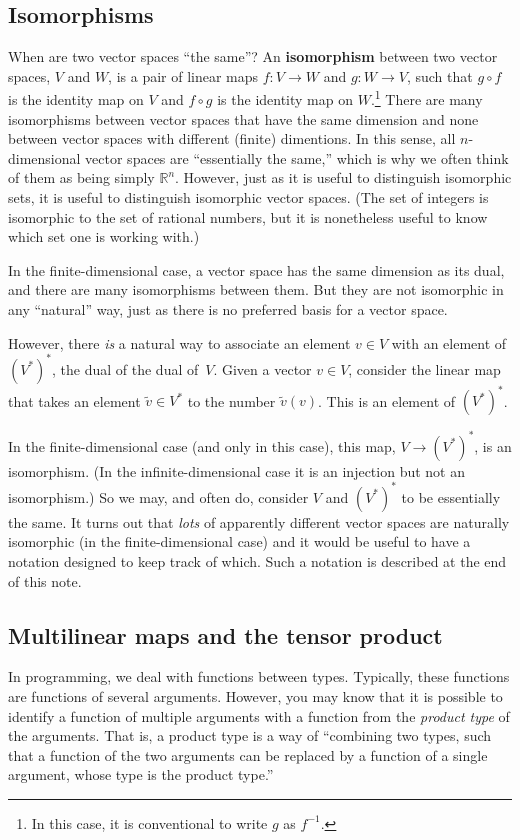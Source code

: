 \documentclass[10pt, a4paper, twocolumn]{article}
\newcommand{\R}{\mathbb{R}}
\newcommand{\defn}[1]{\textbf{#1}}
\begin{document}
\subsection{Isomorphisms}

When are two vector spaces “the same”? An \defn{isomorphism} between two vector
spaces, $V$ and $W$, is a pair of linear maps $f:V \to W$ and $g:W \to V$, such that
$g \circ f$ is the identity map on $V$ and $f \circ g$ is the identity map on
$W$.\footnote{In this case, it is conventional to write $g$ as $f^{-1}$.} There
are many isomorphisms between vector spaces that have the same dimension and
none between vector spaces with different (finite) dimentions. In this sense,
all $n$-dimensional vector spaces are “essentially the same,” which is why we
often think of them as being simply $\R^n$. However, just as it is useful to
distinguish isomorphic sets, it is useful to distinguish isomorphic vector
spaces. (The set of integers is isomorphic to the set of rational numbers, but
it is nonetheless useful to know which set one is working with.)

In the finite-dimensional case, a vector space has the same dimension as its
dual, and there are many isomorphisms between them. But they are not isomorphic
in any “natural” way, just as there is no preferred basis for a vector space.

However, there \emph{is} a natural way to associate an element $v\in V$ with an
element of $(V^*)^*$, the dual of the dual of~$V$. Given a vector $v\in V$,
consider the linear map that takes an element $\tilde{v} \in V^*$ to the number
$\tilde{v}(v)$. This is an element of $(V^*)^*$.

In the finite-dimensional case (and only in this case), this map, $V\to (V^*)^*$,
is an isomorphism. (In the infinite-dimensional case it is an injection but not
an isomorphism.) So we may, and often do, consider $V$ and $(V^*)^*$ to be
essentially the same. It turns out that \emph{lots} of apparently different
vector spaces are naturally isomorphic (in the finite-dimensional case) and it
would be useful to have a notation designed to keep track of which. Such a
notation is described at the end of this note.

\subsection{Multilinear maps and the tensor product}

In programming, we deal with functions between types. Typically, these functions
are functions of several arguments. However, you may know that it is possible to
identify a function of multiple arguments with a function from the \emph{product
  type} of the arguments. That is, a product type is a way of “combining two
types, such that a function of the two arguments can be replaced by a function
of a single argument, whose type is the product type.” 
\end{document}
